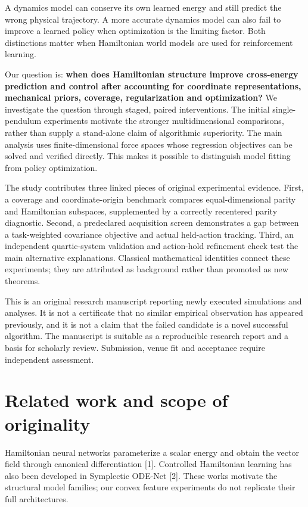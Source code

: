 \documentclass[
  10pt,
]{article}
\begin{document}
A dynamics model can conserve its own learned energy and still predict
the wrong physical trajectory. A more accurate dynamics model can also
fail to improve a learned policy when optimization is the limiting
factor. Both distinctions matter when Hamiltonian world models are used
for reinforcement learning.

Our question is: \textbf{when does Hamiltonian structure improve
cross-energy prediction and control after accounting for coordinate
representations, mechanical priors, coverage, regularization and
optimization?} We investigate the question through staged, paired
interventions. The initial single-pendulum experiments motivate the
stronger multidimensional comparisons, rather than supply a stand-alone
claim of algorithmic superiority. The main analysis uses
finite-dimensional force spaces whose regression objectives can be
solved and verified directly. This makes it possible to distinguish
model fitting from policy optimization.

The study contributes three linked pieces of original experimental
evidence. First, a coverage and coordinate-origin benchmark compares
equal-dimensional parity and Hamiltonian subspaces, supplemented by a
correctly recentered parity diagnostic. Second, a predeclared
acquisition screen demonstrates a gap between a task-weighted covariance
objective and actual held-action tracking. Third, an independent
quartic-system validation and action-hold refinement check test the main
alternative explanations. Classical mathematical identities connect
these experiments; they are attributed as background rather than
promoted as new theorems.

This is an original research manuscript reporting newly executed
simulations and analyses. It is not a certificate that no similar
empirical observation has appeared previously, and it is not a claim
that the failed candidate is a novel successful algorithm. The
manuscript is suitable as a reproducible research report and a basis for
scholarly review. Submission, venue fit and acceptance require
independent assessment.

\hypertarget{related-work-and-scope-of-originality}{%
\section{Related work and scope of
originality}\label{related-work-and-scope-of-originality}}

Hamiltonian neural networks parameterize a scalar energy and obtain the
vector field through canonical differentiation {[}1{]}. Controlled
Hamiltonian learning has also been developed in Symplectic ODE-Net
{[}2{]}. These works motivate the structural model families; our convex
feature experiments do not replicate their full architectures.
\end{document}
